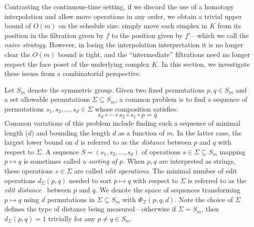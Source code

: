 \documentclass[sn-mathphys]{sn-jnl}
\begin{document}

Contrasting the continuous-time setting, if we discard the use of a homotopy interpolation and allow move operations in any order, we obtain a trivial upper bound of $O(m)$ on the schedule size:  simply move each simplex in $K$ from  its position in the filtration given by $f$ to the position given by $f'$---which we call the \emph{naive strategy}. However, in losing the interpolation interpretation it is no longer clear the $O(m)$ bound is tight, and the ``intermediate'' filtrations need no longer respect the face poset of the underlying complex $K$. In this section, we investigate these issues from a combinatorial perspective. 


Let $S_m$ denote the symmetric group. Given two fixed permutations $p, q \in S_m$ and a set allowable permutations $\Sigma \subseteq S_m$,  a common  problem is to find a sequence of permutations $s_1, s_2, \dots, s_d \in \Sigma$ whose composition satisfies:
	\begin{equation}\label{eq:sorting}
		s_d \circ \cdots \circ s_2 \circ s_1 \circ p = q
	\end{equation}
Common variations of this problem include finding such a sequence of minimal length ($d$) and bounding the length $d$ as a function of $m$. In the latter case, the largest  lower bound on $d$ is referred to as the \emph{distance} between $p$ and $q$ with respect to $\Sigma$. 
A sequence $S = (s_1, s_2, \dots, s_d)$ of operations $s \in \Sigma \subseteq S_m$ mapping $p \mapsto q$ is sometimes called a \emph{sorting of $p$}. 
When $p, q$ are interpreted as strings, these operations $s \in \Sigma$ are called \emph{edit operations}. The minimal number of edit operations $d_\Sigma(p, q)$ needed to sort $p \mapsto q$ with respect to $\Sigma$ is referred to as the \emph{edit distance}~\cite{bergroth2000survey} between $p$ and $q$.
We denote the space of sequences transforming $p \mapsto q$ using $d$ permutations in $\Sigma \subseteq S_m$ with $\Phi_\Sigma(p,q,d)$.
Note the choice of $\Sigma$ defines the type of distance being measured---otherwise if $\Sigma = S_m$, then $d_\Sigma(p, q) = 1$ trivially for any $p\neq  q \in S_m$.
\end{document}
